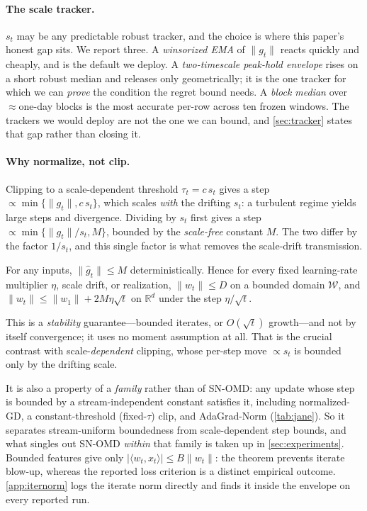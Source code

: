 \documentclass{article}
\newcommand{\R}{\mathbb{R}}
\newcommand{\norm}[1]{\lVert #1 \rVert}
\newcommand{\gt}{g_t}
\begin{document}
\paragraph{The scale tracker.} $s_t$ may be any predictable robust tracker, and the choice
is where this paper's honest gap sits. We report three. A \emph{winsorized EMA} of
$\norm{\gt}$ reacts quickly and cheaply, and is the default we deploy. A \emph{two-timescale
peak-hold envelope} rises on a short robust median and releases only geometrically; it is the
one tracker for which we can \emph{prove} the condition the regret bound needs. A \emph{block
median} over ${\approx}$one-day blocks is the most accurate per-row across ten frozen windows.
The trackers we would deploy are not the one we can bound, and \cref{sec:tracker} states that
gap rather than closing it.

\paragraph{Why normalize, not clip.} Clipping to a scale-dependent threshold
$\tau_t=c\,s_t$ gives a step $\propto\min\{\norm{\gt},c\,s_t\}$, which scales
\emph{with} the drifting $s_t$: a turbulent regime yields large steps and divergence.
Dividing by $s_t$ first gives a step $\propto\min\{\norm{\gt}/s_t,M\}$, bounded by the
\emph{scale-free} constant $M$. The two differ by the factor $1/s_t$, and this single
factor is what removes the scale-drift transmission.

\begin{proposition}
\label{thm:stability}
For any inputs, $\norm{\hat g_t}\le M$ deterministically. Hence for every fixed learning-rate
multiplier $\eta$, scale drift, or realization, $\norm{w_t}\le D$ on a bounded domain $\mathcal W$, and
$\norm{w_t}\le\norm{w_1}+2M\eta\sqrt t$ on $\R^d$ under the step $\eta/\sqrt t$.
\end{proposition}
This is a \emph{stability} guarantee---bounded iterates, or $O(\sqrt t)$ growth---and not by
itself convergence; it uses no moment assumption at all. That is the crucial contrast with
scale-\emph{dependent} clipping, whose per-step move $\propto s_t$ is bounded only by the
drifting scale.

It is also a property of a \emph{family} rather than of SN-OMD: any update whose step is bounded
by a stream-independent constant satisfies it, including normalized-GD, a constant-threshold
(fixed-$\tau$) clip, and AdaGrad-Norm (\cref{tab:jane}). So it separates stream-uniform
boundedness from scale-dependent step bounds, and what singles out SN-OMD \emph{within} that family
is taken up in \cref{sec:experiments}. Bounded features give only
$|\langle w_t,x_t\rangle|\le B\norm{w_t}$: the theorem prevents iterate blow-up, whereas
the reported loss criterion is a distinct empirical outcome. \cref{app:iternorm} logs the
iterate norm directly and finds it inside the envelope on every reported run.
\end{document}
